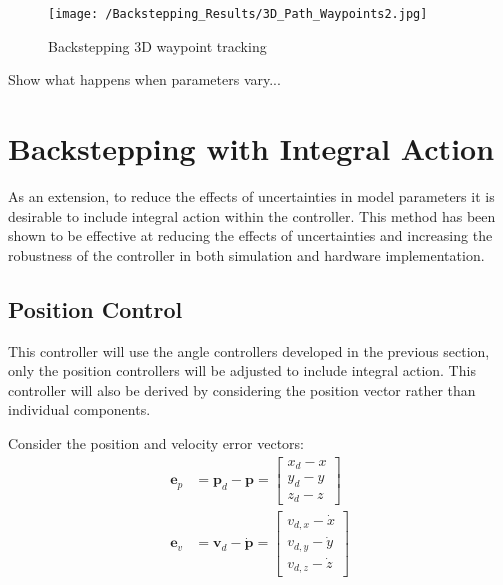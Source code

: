 \begin{figure}[htb]
\begin{center}
	\texttt{[image: /Backstepping\_Results/3D\_Path\_Waypoints2.jpg]}%
	\end{center}
	\caption{Backstepping 3D waypoint tracking}%
	\label{fig:Backstep_path}%
\end{figure}


Show what happens when parameters vary...
\FloatBarrier
\section{Backstepping with Integral Action}\label{section:IntBack}
As an extension, to reduce the effects of uncertainties in model parameters it is desirable to include integral action within the controller. This method has been shown to be effective at reducing the effects of uncertainties and increasing the robustness of the controller in both simulation \cite{Jasim2015} and hardware \cite{Bouabdallah2006} implementation.

\subsection{Position Control}

This controller will use the angle controllers developed in the previous section, only the position controllers will be adjusted to include integral action. This controller will also be derived by considering the position vector rather than individual components.

Consider the position and velocity error vectors: 
\begin{equation}\label{eqn:ErrorVectors}
\begin{split}
\mathbf{e}_{p}&=\mathbf{p}_{d}-\mathbf{p}=\begin{bmatrix}
x_{d}-x \\ y_{d}-y\\ z_{d}-z
\end{bmatrix}\\
\mathbf{e}_{v}&=\mathbf{v}_d-\mathbf{\dot{p}}=\begin{bmatrix}
v_{d,x}-\dot{x} \\ v_{d,y}-\dot{y} \\ v_{d,z}-\dot{z}
\end{bmatrix}\\
\end{split}
\end{equation}

